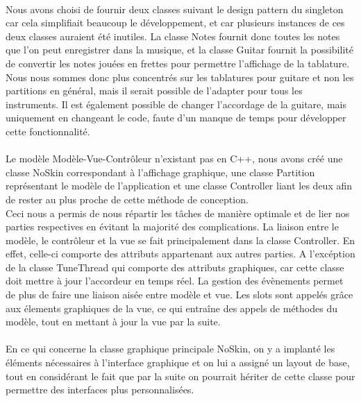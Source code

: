\paragraph{}
Nous avons choisi de fournir deux classes suivant le design pattern du singleton car cela simplifiait beaucoup le développement, et 
car plusieurs instances de ces deux classes auraient été inutiles. La classe Notes fournit donc toutes les notes que l'on peut enregistrer
dans la musique, et la classe Guitar fournit la possibilité de convertir les notes jouées en frettes pour permettre l'affichage de la 
tablature. Nous nous sommes donc plus concentrés sur les tablatures pour guitare et non les partitions en général, 
mais il serait possible de l'adapter pour tous les instruments. Il est également possible de changer l'accordage de la guitare, mais 
uniquement en changeant le code, faute d'un manque de temps pour développer cette fonctionnalité.

\paragraph{}
Le modèle Modèle-Vue-Contrôleur n'existant pas en C++, nous avons créé une classe NoSkin correspondant à l'affichage graphique, une classe Partition représentant le modèle de l'application et une classe Controller liant les deux afin de rester au plus proche de cette méthode de conception. \\
Ceci nous a permis de nous répartir les tâches de manière optimale et de lier nos parties respectives en évitant la majorité des complications. La liaison 
entre le modèle, le contrôleur et la vue se fait principalement dans la classe Controller. En effet, celle-ci comporte des attributs appartenant aux autres 
parties. A l'excéption de la classe TuneThread qui comporte des attributs graphiques, car cette classe doit mettre à jour l'accordeur en temps réel. La gestion des évènements permet de plus de faire une liaison aisée entre modèle et vue. Les slots sont appelés grâce aux 
élements graphiques de la vue, ce qui entraîne des appels de méthodes du modèle, tout en mettant à jour la vue par la suite. 

\paragraph{}
En ce qui concerne la classe graphique principale NoSkin, on y a implanté les éléments nécessaires à l'interface graphique et on lui a assigné un layout de base, tout en considérant le fait que par la suite on pourrait hériter de cette classe pour permettre des interfaces plus personnalisées.

